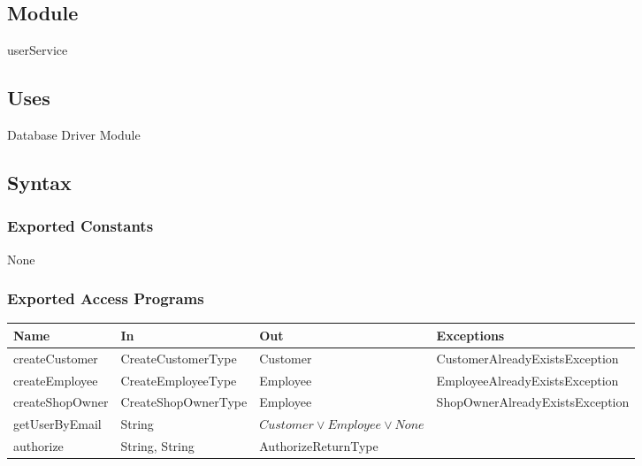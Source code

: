 \documentclass[12pt, titlepage]{article}
\begin{document}
\subsection{Module}

userService

\subsection{Uses}

Database Driver Module

\subsection{Syntax}

\subsubsection{Exported Constants}

None






\subsubsection{Exported Access Programs}

\begin{center}
	\begin{adjustbox}{width=\textwidth}
		\begin{tabular}{llll}
			\hline
			\textbf{Name}   & \textbf{In}         & \textbf{Out}                       & \textbf{Exceptions}             \\
			\hline
			createCustomer  & CreateCustomerType  & Customer                           & CustomerAlreadyExistsException  \\
			createEmployee  & CreateEmployeeType  & Employee                           & EmployeeAlreadyExistsException  \\
			createShopOwner & CreateShopOwnerType & Employee                           & ShopOwnerAlreadyExistsException \\
			getUserByEmail  & String              & $Customer \lor Employee \lor None$ & ~                               \\
			authorize       & String, String      & AuthorizeReturnType                & ~                               \\
			\hline
		\end{tabular}
	\end{adjustbox}
\end{center}
\end{document}
